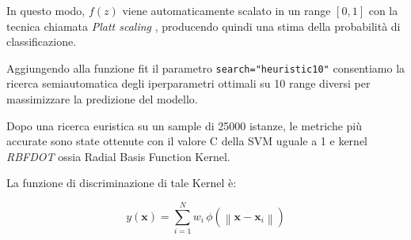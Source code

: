 In questo modo, $f(z)$ viene automaticamente scalato in un range $[0, 1]$ con la tecnica chiamata \textit{Platt scaling} \cite{Platt99probabilisticoutputs}, producendo quindi una stima della probabilità di classificazione.
\par
Aggiungendo alla funzione fit il parametro \texttt{search="heuristic10"} consentiamo la ricerca semiautomatica degli iperparametri ottimali su 10 range diversi per massimizzare la predizione del modello.
\par
Dopo una ricerca euristica su un sample di 25000 istanze, le metriche più accurate sono state ottenute con il valore C della SVM uguale a 1 e kernel \textit{RBFDOT} ossia Radial Basis Function Kernel.
\par
La funzione di discriminazione di tale Kernel è:

$$y\left(\mathbf{x}\right) = \sum_{i=1}^N w_i \, \phi\left(\left\|\mathbf{x} - \mathbf{x}_i\right\|\right)\label{RBFK}$$
